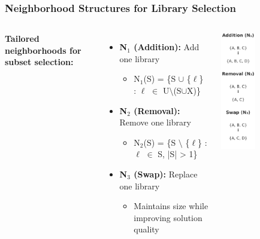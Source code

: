 \documentclass{beamer}
\begin{document}
\begin{frame}
\frametitle{Neighborhood Structures for Library Selection}

\begin{columns}[T]
\vspace{1.5cm}
\textbf{Tailored neighborhoods for subset selection:}
\begin{itemize}
\item \textbf{N$_1$ (Addition):} Add one library
  \begin{itemize}
  \item N$_1$(S) = \{S $\cup$ \{$\ell$\} : $\ell$ $\in$ U$\setminus$(S$\cup$X)\}
  \end{itemize}
\item \textbf{N$_2$ (Removal):} Remove one library
  \begin{itemize}
  \item N$_2$(S) = \{S $\setminus$ \{$\ell$\} : $\ell$ $\in$ S, |S| > 1\}
  \end{itemize}
\item \textbf{N$_3$ (Swap):} Replace one library
  \begin{itemize}
  \item Maintains size while improving solution quality
  \end{itemize}
\end{itemize}
\begin{center}
\includegraphics[width=0.4\textwidth]{Imagens/Operaçoes_vizinhaça.png}

\end{center}
\end{columns}
\end{frame}
\end{document}
